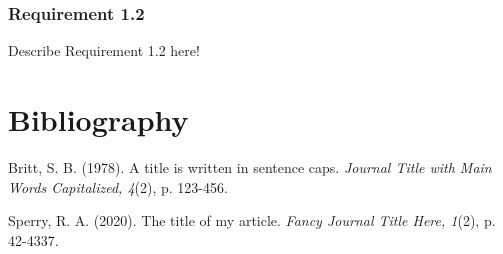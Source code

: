 \documentclass{article}
\begin{document}
\subsubsection{Requirement 1.2}
Describe Requirement 1.2 here!

\section{Bibliography}

Britt, S. B. (1978). A title is written in sentence caps. \textit{Journal Title with Main Words Capitalized, 4}(2), p. 123-456.

\vspace{1em}

Sperry, R. A. (2020). The title of my article. \textit{Fancy Journal Title Here, 1}(2), p. 42-4337.
\end{document}
